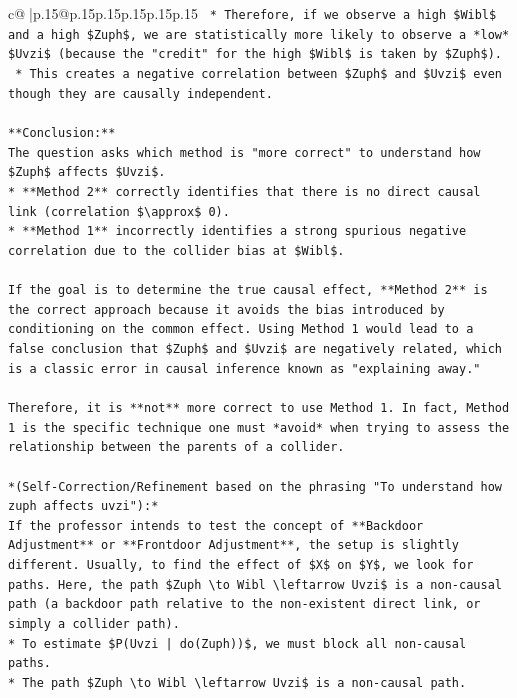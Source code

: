 \documentclass{article}
\begin{document}
{\begin{supertabular}{c@{$\;$}|p{.15\linewidth}@{}p{.15\linewidth}p{.15\linewidth}p{.15\linewidth}p{.15\linewidth}p{.15\linewidth}}
{{{\texttt{    *   Therefore, if we observe a high \$Wibl\$ and a high \$Zuph\$, we are statistically more likely to observe a *low* \$Uvzi\$ (because the "credit" for the high \$Wibl\$ is taken by \$Zuph\$).} \\
\texttt{    *   This creates a negative correlation between \$Zuph\$ and \$Uvzi\$ even though they are causally independent.} \\
\\ 
\texttt{**Conclusion:**} \\
\texttt{The question asks which method is "more correct" to understand how \$Zuph\$ affects \$Uvzi\$.} \\
\texttt{*   **Method 2** correctly identifies that there is no direct causal link (correlation \$\textbackslash{}approx\$ 0).} \\
\texttt{*   **Method 1** incorrectly identifies a strong spurious negative correlation due to the collider bias at \$Wibl\$.} \\
\\ 
\texttt{If the goal is to determine the true causal effect, **Method 2** is the correct approach because it avoids the bias introduced by conditioning on the common effect. Using Method 1 would lead to a false conclusion that \$Zuph\$ and \$Uvzi\$ are negatively related, which is a classic error in causal inference known as "explaining away."} \\
\\ 
\texttt{Therefore, it is **not** more correct to use Method 1. In fact, Method 1 is the specific technique one must *avoid* when trying to assess the relationship between the parents of a collider.} \\
\\ 
\texttt{*(Self{-}Correction/Refinement based on the phrasing "To understand how zuph affects uvzi"):*} \\
\texttt{If the professor intends to test the concept of **Backdoor Adjustment** or **Frontdoor Adjustment**, the setup is slightly different. Usually, to find the effect of \$X\$ on \$Y\$, we look for paths. Here, the path \$Zuph \textbackslash{}to Wibl \textbackslash{}leftarrow Uvzi\$ is a non{-}causal path (a backdoor path relative to the non{-}existent direct link, or simply a collider path).} \\
\texttt{*   To estimate \$P(Uvzi | do(Zuph))\$, we must block all non{-}causal paths.} \\
\texttt{*   The path \$Zuph \textbackslash{}to Wibl \textbackslash{}leftarrow Uvzi\$ is a non{-}causal path.} \\
}}}
\end{supertabular}}
\end{document}
